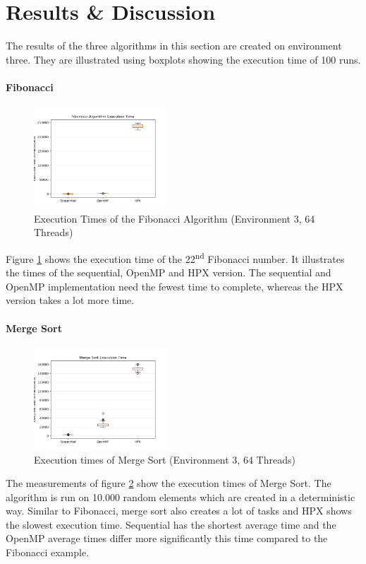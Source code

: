 \section{Results \& Discussion}

The results of the three algorithms in this section are created on environment three.
They are illustrated using boxplots showing the execution time of 100 runs.


\paragraph{Fibonacci}
\begin{figure}[htbp]
	\centering
	\includegraphics[width=0.45\textwidth]{figures/fib_NoOp.png}
	\caption{Execution Times of the Fibonacci Algorithm (Environment 3, 64 Threads)}
	\label{fig:fib_NoOp}
\end{figure}

Figure \ref{fig:fib_NoOp} shows the execution time of the 22\textsuperscript{nd} Fibonacci number.
It illustrates the times of the sequential, OpenMP and HPX version.
The sequential and OpenMP implementation need the fewest time to complete, whereas the HPX version takes a lot more time.

\paragraph{Merge Sort}
  \begin{figure}[htbp]
	\centering
	\includegraphics[width=0.45\textwidth]{figures/sort_NoOp.png}
	\caption{Execution times of Merge Sort (Environment 3, 64 Threads)}
	\label{fig:sort_NoOp}
  \end{figure}
  The measurements of figure \ref{fig:sort_NoOp} show the execution times of Merge Sort.
  The algorithm is run on 10.000 random elements which are created in a deterministic way.
  Similar to Fibonacci, merge sort also creates a lot of tasks and HPX shows the slowest execution time.
  Sequential has the shortest average time and the OpenMP average times differ more significantly this time compared to the Fibonacci example.
  
